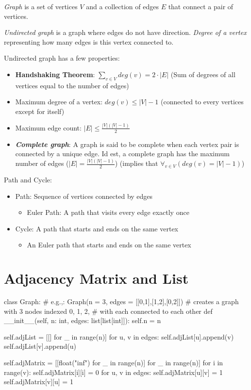 
\textit{Graph} is a set of vertices $V$ and a collection of edges $E$ that connect a pair of vertices.

\noindent \textit{Undirected graph} is a graph where edges do not have direction. \textit{Degree of a vertex} representing how many edges is this vertex connected to.

Undirected graph has a few properties:
\begin{itemize}
  \item \textbf{Handshaking Theorem}: \(\sum_{v \in V} deg(v) = 2 \cdot |E|\) (Sum of degrees of all vertices equal to the number of edges)
  \item Maximum degree of a vertex: $deg(v) \leq |V| - 1$ (connected to every vertices except for itself)
  \item Maximum edge count: $|E| \leq \frac{|V|(|V| - 1)}{2}$
  \item \textbf{\textit{Complete graph}}: A graph is said to be complete when each vertex pair is connected by a unique edge. Id est, a complete graph has the maximum number of edges ($|E| = \frac{|V|(|V| - 1)}{2}$) (implies that $\forall_{v \in V} (deg(v) = |V| - 1)$)
\end{itemize}

Path and Cycle:
\begin{itemize}
  \item Path: Sequence of vertices connected by edges
  \begin{itemize}
    \item Euler Path: A path that visits every edge exactly once
  \end{itemize}
\item Cycle: A path that starts and ends on the same vertex
  \begin{itemize}
    \item An Euler path that starts and ends on the same vertex
  \end{itemize}
\end{itemize}

\section{Adjacency Matrix and List}

\begin{python}
class Graph:
    # e.g.,: Graph(n = 3, edges = [[0,1],[1,2],[0,2]])
    # creates a graph with 3 nodes indexed 0, 1, 2,
    # with each connected to each other
    def __init__(self, n: int, edges: list[list[int]]):
        self.n = n

        self.adjList = [[] for _ in range(n)]
        for u, v in edges:
            self.adjList[u].append(v)
            self.adjList[v].append(u)

        self.adjMatrix = [[float("inf") for _ in range(n)] for _ in range(n)]
        for i in range(v):
            self.adjMatrix[i][i] = 0
        for u, v in edges:
            self.adjMatrix[u][v] = 1
            self.adjMatrix[v][u] = 1
\end{python}


